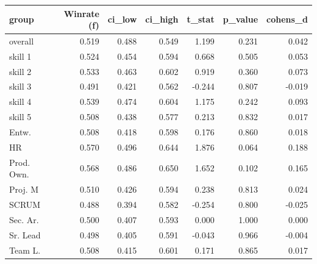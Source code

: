 \begin{tabular}{lrrrrrr}
\toprule
group & Winrate (f) & ci\_low & ci\_high & t\_stat & p\_value & cohens\_d \\
\midrule
overall & 0.519 & 0.488 & 0.549 & 1.199 & 0.231 & 0.042 \\
skill 1 & 0.524 & 0.454 & 0.594 & 0.668 & 0.505 & 0.053 \\
skill 2 & 0.533 & 0.463 & 0.602 & 0.919 & 0.360 & 0.073 \\
skill 3 & 0.491 & 0.421 & 0.562 & -0.244 & 0.807 & -0.019 \\
skill 4 & 0.539 & 0.474 & 0.604 & 1.175 & 0.242 & 0.093 \\
skill 5 & 0.508 & 0.438 & 0.577 & 0.213 & 0.832 & 0.017 \\
Entw. & 0.508 & 0.418 & 0.598 & 0.176 & 0.860 & 0.018 \\
HR & 0.570 & 0.496 & 0.644 & 1.876 & 0.064 & 0.188 \\
Prod. Own. & 0.568 & 0.486 & 0.650 & 1.652 & 0.102 & 0.165 \\
Proj. M & 0.510 & 0.426 & 0.594 & 0.238 & 0.813 & 0.024 \\
SCRUM & 0.488 & 0.394 & 0.582 & -0.254 & 0.800 & -0.025 \\
Sec. Ar. & 0.500 & 0.407 & 0.593 & 0.000 & 1.000 & 0.000 \\
Sr. Lead & 0.498 & 0.405 & 0.591 & -0.043 & 0.966 & -0.004 \\
Team L. & 0.508 & 0.415 & 0.601 & 0.171 & 0.865 & 0.017 \\
\bottomrule
\end{tabular}
